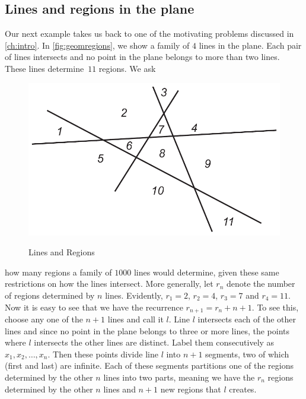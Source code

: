 \subsection{Lines and regions in the plane}\label{s:recurrence:intro:lines}
Our next example takes us back to one of the motivating problems
discussed in \autoref{ch:intro}.  In \autoref{fig:geomregions}, we
show a family of $4$ lines in the plane.  Each pair of lines
intersects and no point in the plane belongs to more than two lines.
These lines determine~$11$ regions.  We ask
 \begin{figure}
 \begin{center}
 \includegraphics[scale=.6]{recurrence-figs/3012-fig9}\\
 \caption{\label{fig:geomregions}Lines and Regions} 
 \end{center}
 \end{figure}
how many regions a family of $1000$ lines would determine, given
these same restrictions on how the lines intersect.  More generally, let
$r_n$ denote the number of regions determined by $n$ lines.  Evidently,
$r_1=2$, $r_2=4$, $r_3=7$ and $r_4=11$.  Now it is easy to see that
we have the recurrence $r_{n+1} = r_n+n+1$.  To see this, choose any
one of the $n+1$ lines and call it $l$.  Line $l$ 
intersects each of the other lines and since no point in the plane
belongs to three or more lines, the points where $l$ intersects
the other lines are distinct.  Label them consecutively as
$x_1,x_2,\dots,x_n$.  Then these points divide line $l$ into
$n+1$ segments, two of which (first and last) are infinite.  Each of
these segments partitions one of the regions determined by the other
$n$ lines into two parts, meaning we have the $r_n$ regions determined
by the other $n$ lines and $n+1$ new regions that $l$ creates.

